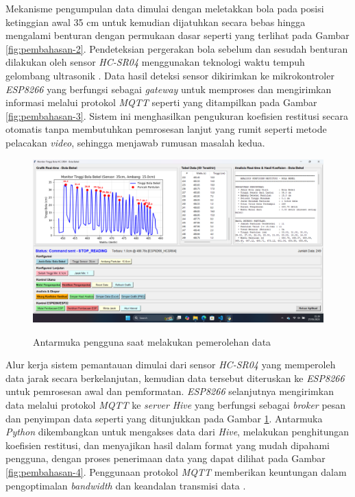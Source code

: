 Mekanisme pengumpulan data dimulai dengan meletakkan bola pada posisi ketinggian awal 35 cm untuk kemudian dijatuhkan secara bebas hingga mengalami benturan dengan permukaan dasar seperti yang terlihat pada Gambar \ref{fig:pembahasan-2}. Pendeteksian pergerakan bola sebelum dan sesudah benturan dilakukan oleh sensor \textit{HC-SR04} menggunakan teknologi waktu tempuh gelombang ultrasonik \citep{johnson2019time}. Data hasil deteksi sensor dikirimkan ke mikrokontroler \textit{ESP8266} yang berfungsi sebagai \textit{gateway} untuk memproses dan mengirimkan informasi melalui protokol \textit{MQTT} seperti yang ditampilkan pada Gambar \ref{fig:pembahasan-3}. Sistem ini menghasilkan pengukuran koefisien restitusi secara otomatis tanpa membutuhkan pemrosesan lanjut yang rumit seperti metode pelacakan \textit{video}, sehingga menjawab rumusan masalah kedua.

\begin{figure}[!htbp]
    \centering
    \includegraphics[width=\linewidth]{images/Screenshot (8).png}
    \caption{Antarmuka pengguna saat melakukan pemerolehan data}
    \citep{ajitot2024koefisien}
    \label{fig:antarmuka-gui-akuisisi}
\end{figure}

Alur kerja sistem pemantauan dimulai dari sensor \textit{HC-SR04} yang memperoleh data jarak secara berkelanjutan, kemudian data tersebut diteruskan ke \textit{ESP8266} untuk pemrosesan awal dan pemformatan. \textit{ESP8266} selanjutnya mengirimkan data melalui protokol \textit{MQTT} ke \textit{server} \textit{Hive} yang berfungsi sebagai \textit{broker} pesan dan penyimpan data seperti yang ditunjukkan pada Gambar \ref{fig:antarmuka-gui-akuisisi}. Antarmuka \textit{Python} dikembangkan untuk mengakses data dari \textit{Hive}, melakukan penghitungan koefisien restitusi, dan menyajikan hasil dalam format yang mudah dipahami pengguna, dengan proses penerimaan data yang dapat dilihat pada Gambar \ref{fig:pembahasan-4}. Penggunaan protokol \textit{MQTT} memberikan keuntungan dalam pengoptimalan \textit{bandwidth} dan keandalan transmisi data \citep{thompson2020mqtt}.

